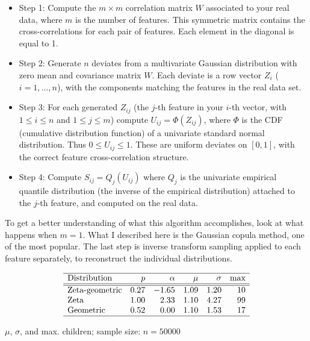 \documentclass[oneside,10pt]{book}
\begin{document}
\begin{itemize}
\item Step 1: Compute the $m\times m$ correlation matrix $W$ associated to your real data, where $m$ is the number of features.
 This symmetric matrix contains the cross-correlations for each pair of features. Each element in the diagonal is equal to 1. 
\item Step 2: Generate $n$ deviates from a multivariate Gaussian distribution with zero mean and covariance matrix $W$. Each deviate is a 
 row vector $Z_i$ ($i=1,\dots,n$), with the components matching the features in the real data set.
\item Step 3: For each generated $Z_{ij}$ (the $j$-th feature in your $i$-th vector, with
 $1\leq i\leq n$ and $1\leq j\leq m$) compute $U_{ij}=\Phi(Z_{ij})$, where $\Phi$ is
 the CDF (cumulative distribution function) of a univariate standard normal distribution. Thus $0\leq U_{ij}\leq 1$. These
 are uniform deviates on $[0, 1]$, with the correct feature cross-correlation structure.
\item Step 4: Compute $S_{ij}=Q_j(U_{ij})$ where $Q_j$ is the univariate
\textcolor{index}{empirical quantile distribution} (the inverse of the 
\textcolor{index}{empirical distribution}) attached to the $j$-th feature, and computed on the real data.
\end{itemize}\vspace{1ex}

\noindent To get a better understanding of what this algorithm accomplishes, look at what happens when $m=1$. What I described here 
 is the Gaussian copula method, one of the most popular. The last step is 
\textcolor{index}{inverse transform sampling} applied to each feature separately, to reconstruct the individual distributions.

\begin{table}[H]
\[
\begin{array}{lrrrrr}
\hline
\text{Distribution}	& p & \alpha	& \mu&	\sigma & \text{max}\\
\hline
\hline
 \text{Zeta-geometric} & 0.27 & -1.65 &  1.09 &  1.20 & 10\\
\text{Zeta} & 1.00 & 2.33 &   1.10 & 4.27 & 99 \\
\text{Geometric}  & 0.52 & 0.00 &  1.10 & 1.53 & 17\\
\hline
\end{array}
\]
\caption{\label{chocolat} $\mu$, $\sigma$, and max. children; sample size: $n=\num{50000}$}
\end{table}
\end{document}
